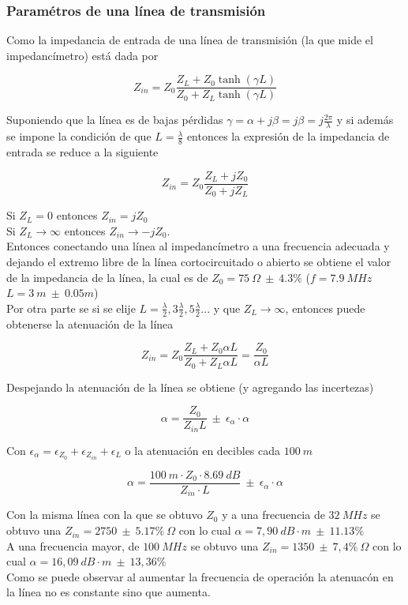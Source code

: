 \documentclass[a4paper,10pt]{article}
\begin{document}
		\subsubsection{Param\'etros de una l\'inea de transmisi\'on}
		
		\indent Como la impedancia de entrada de una l\'inea de transmisi\'on 
		(la que mide el impedanc\'imetro) est\'a dada por 
		
		$$Z_{in}=Z_0\frac{Z_L+Z_0\tanh(\gamma L)}{Z_0+Z_L\tanh(\gamma L)}$$
		
		\indent Suponiendo que la l\'inea es de bajas p\'erdidas 
		$\gamma=\alpha+j\beta=j\beta=j\frac{2\pi}{\lambda}$ y si adem\'as se 
		impone la condici\'on de que $L=\frac{\lambda}{8}$ entonces la 
		expresi\'on de la impedancia de entrada se reduce a la siguiente
		
		$$Z_{in}=Z_0\frac{Z_L+jZ_0}{Z_0+jZ_L}$$
		
		\indent Si $Z_L= 0$ entonces $Z_{in}=jZ_0$ \\
		\indent Si $Z_L \rightarrow \infty$ entonces $Z_{in}\rightarrow-jZ_0$.\\
		\indent Entonces conectando una l\'inea al impedanc\'imetro a una 
		frecuencia adecuada y dejando el extremo libre de la l\'inea 
		cortocircuitado o abierto se obtiene el valor de la impedancia de la 
		l\'inea, la cual es de 
		$Z_0=75~\Omega~\pm~4.3\%$ ($f=7.9~MHz$ $L=3~m~\pm~0.05m$) \\
		
		\indent Por otra parte se si se elije 
		$L=\frac{\lambda}{2},3\frac{\lambda}{2}, 5\frac{\lambda}{2} ...$ y que 
		$Z_L\rightarrow\infty$, entonces puede obtenerse la atenuaci\'on de la 
		l\'inea
		
		$$Z_{in}=Z_0\frac{Z_L+Z_0\alpha L}{Z_0+Z_L\alpha L}=\frac{Z_0}{\alpha L}$$
		
		\indent Despejando la atenuaci\'on de la l\'inea se obtiene (y agregando
		las incertezas)
		
		$$\alpha=\frac{Z_0}{Z_{in} L}~\pm~\epsilon_{\alpha}\cdot\alpha$$
		
		\indent Con $\epsilon_{\alpha}=\epsilon_{Z_0}+\epsilon_{Z_{in}}+
		\epsilon_{L}$ o la atenuaci\'on en decibles cada $100~m$
		
		$$\alpha=\frac{100~m\cdot Z_0\cdot8.69~dB}{Z_{in}\cdot L}~\pm~
		\epsilon_{\alpha}\cdot \alpha$$
		
		\indent Con la misma l\'inea con la que se obtuvo $Z_0$ y a una 
		frecuencia de $32~MHz$ se obtuvo una $Z_{in}=2750~\pm~5.17\%~\Omega$ con
		lo cual $\alpha=7,90~dB\cdot m~\pm~11.13\%$ \\
		\indent A una frecuencia mayor, de $100~MHz$ se obtuvo una 
		$Z_{in}=1350~\pm~7,4\%~\Omega$ con lo cual 
		$\alpha=16,09~dB\cdot m~\pm~13,36\%$\\
		\indent Como se puede observar al aumentar la frecuencia de operaci\'on 
		la atenuac\'on en la l\'inea no es constante sino que aumenta.
		
\end{document}

